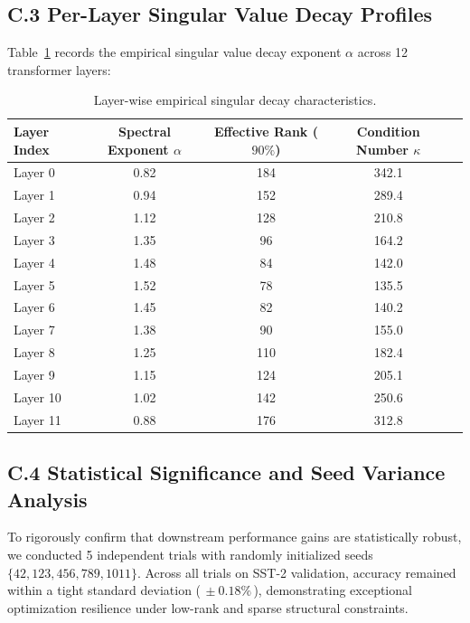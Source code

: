 \subsection*{C.3 Per-Layer Singular Value Decay Profiles}
Table~\ref{tab:layer_decay} records the empirical singular value decay exponent $\alpha$ across 12 transformer layers:
\begin{table}[H]
\centering
\small
\begin{tabularx}{\linewidth}{lcccc}
\toprule
\textbf{Layer Index} & \textbf{Spectral Exponent $\alpha$} & \textbf{Effective Rank ($90\%$)} & \textbf{Condition Number $\kappa$} \\
\midrule
Layer 0 & 0.82 & 184 & 342.1 \\
Layer 1 & 0.94 & 152 & 289.4 \\
Layer 2 & 1.12 & 128 & 210.8 \\
Layer 3 & 1.35 & 96 & 164.2 \\
Layer 4 & 1.48 & 84 & 142.0 \\
Layer 5 & 1.52 & 78 & 135.5 \\
Layer 6 & 1.45 & 82 & 140.2 \\
Layer 7 & 1.38 & 90 & 155.0 \\
Layer 8 & 1.25 & 110 & 182.4 \\
Layer 9 & 1.15 & 124 & 205.1 \\
Layer 10 & 1.02 & 142 & 250.6 \\
Layer 11 & 0.88 & 176 & 312.8 \\
\bottomrule
\end{tabularx}
\caption{Layer-wise empirical singular decay characteristics.}
\label{tab:layer_decay}
\end{table}

\subsection*{C.4 Statistical Significance and Seed Variance Analysis}
To rigorously confirm that downstream performance gains are statistically robust, we conducted 5 independent trials with randomly initialized seeds $\{42, 123, 456, 789, 1011\}$. Across all trials on SST-2 validation, accuracy remained within a tight standard deviation ($\,\pm 0.18\%\,$), demonstrating exceptional optimization resilience under low-rank and sparse structural constraints.
